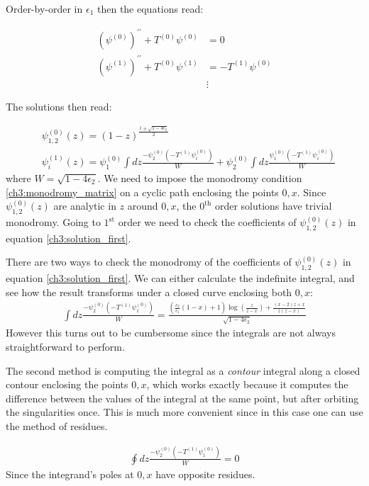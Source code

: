   Order-by-order in $\epsilon_1$ then the equations read:
  
  \begin{align}
    (\psi^{(0)})^{\prime\prime} + T^{(0)}\psi^{(0)} &= 0 \\
    (\psi^{(1)})^{\prime\prime} + T^{(0)}\psi^{(1)} &= -T^{(1)} \psi^{(0)} \\
    &\vdots
  \end{align}

  The solutions then read:
  
  \begin{align}
   &\psi^{(0)}_{1,2}(z) =(1-z)^{\frac{1\pm \sqrt{1-4\epsilon_2}}{2}} \\
   &\psi^{(1)}_i(z) = \psi_1^{(0)}\int dz \frac{-\psi_2^{(0)}(-T^{(1)}\psi^{(0)}_i)}{W} + \psi^{(0)}_2\int dz \frac{\psi_1^{(0)}(-T^{(1)}\psi^{(0)}_i)}{W} \label{ch3:solution_first}
  \end{align}
  where $W=\sqrt{1-4\epsilon_2}$. We need to impose the monodromy condition \ref{ch3:monodromy_matrix} on a cyclic path enclosing the points $0, x$. Since $\psi^{(0)}_{1,2}(z)$ are analytic in $z$ around $0, x$, the $0^\text{th}$ order solutions have trivial monodromy. Going to $1^\text{st}$ order we need to check the coefficients of  $\psi^{(0)}_{1,2}(z)$ in equation \ref{ch3:solution_first}.
  
  There are two ways to check the monodromy of the coefficients of  $\psi^{(0)}_{1,2}(z)$ in equation \ref{ch3:solution_first}. We can either calculate the indefinite integral, and see how the result transforms under a closed curve enclosing both $0,x$:
  \begin{align}
   \int dz \frac{-\psi_2^{(0)}(-T^{(1)}\psi^{(0)}_1)}{W} = \frac{\left(\frac{c_2}{\epsilon_1}(1-x)+1 \right)\log(\frac{z}{z-x})+\frac{(x-2)z+x}{z(z-x)}}{\sqrt{1-4\epsilon_2}}
  \end{align}
  However this turns out to be cumbersome since the integrals are not always straightforward to perform. 
  
  The second method is computing the integral as a \emph{contour} integral along a closed contour enclosing the points $0,x$, which works exactly because it computes the difference between the values of the integral at the same point, but after orbiting the singularities once. This is much more convenient since in this case one can use the method of residues.
  
  \begin{align}
   \oint dz \frac{-\psi_2^{(0)}(-T^{(1)}\psi^{(0)}_1)}{W} = 0
  \end{align}
  Since the integrand's poles at $0,x$ have opposite residues.
  
